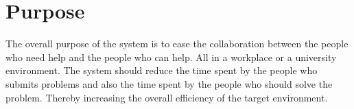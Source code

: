 \section{Purpose}
The overall purpose of the system is to ease the collaboration between the people who need help and the people who can help. 
All in a workplace or a university environment. 
The system should reduce the time spent by the people who submits problems and also the time spent by the people who should solve the problem. 
Thereby increasing the overall efficiency of the target environment. 


